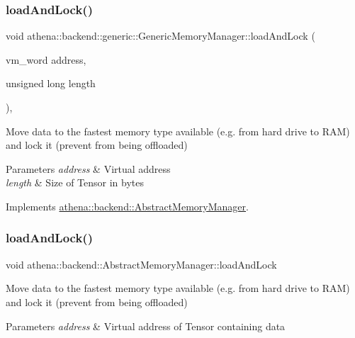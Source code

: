 \subsubsection{\texorpdfstring{load\+And\+Lock()}{loadAndLock()}\hspace{0.1cm}{\footnotesize\ttfamily [1/4]}}
{\footnotesize\ttfamily void athena\+::backend\+::generic\+::\+Generic\+Memory\+Manager\+::load\+And\+Lock (\begin{DoxyParamCaption}\item[{vm\+\_\+word}]{address,  }\item[{unsigned long}]{length }\end{DoxyParamCaption})\hspace{0.3cm}{\ttfamily [override]}, {\ttfamily [virtual]}}

Move data to the fastest memory type available (e.\+g. from hard drive to R\+AM) and lock it (prevent from being offloaded) 
\begin{DoxyParams}{Parameters}
{\em address} & Virtual address \\
\hline
{\em length} & Size of Tensor in bytes \\
\hline
\end{DoxyParams}


Implements \mbox{\hyperlink{classathena_1_1backend_1_1_abstract_memory_manager_a9fe52e4020802d6f526fba06adce8407}{athena\+::backend\+::\+Abstract\+Memory\+Manager}}.

\mbox{\label{classathena_1_1backend_1_1generic_1_1_generic_memory_manager_a47ea5a77f81f91f803f748720c5c19b5}} 
\subsubsection{\texorpdfstring{load\+And\+Lock()}{loadAndLock()}\hspace{0.1cm}{\footnotesize\ttfamily [2/4]}}
{\footnotesize\ttfamily void athena\+::backend\+::\+Abstract\+Memory\+Manager\+::load\+And\+Lock}

Move data to the fastest memory type available (e.\+g. from hard drive to R\+AM) and lock it (prevent from being offloaded) 
\begin{DoxyParams}{Parameters}
{\em address} & Virtual address of Tensor containing data \\
\hline
\end{DoxyParams}
\mbox{\label{classathena_1_1backend_1_1generic_1_1_generic_memory_manager_a2bbfba2a5104aab3068d46214a6ae7df}} 
